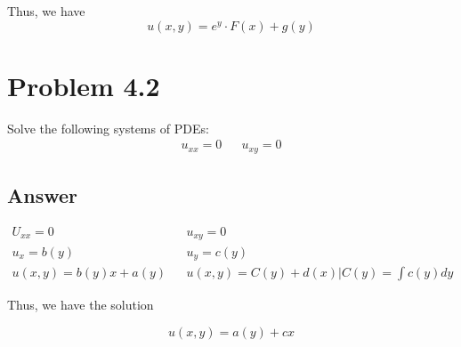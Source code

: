 \documentclass{article}
\begin{document}
Thus, we have
$$u(x,y) = e^{y} \cdot F(x) + g(y)$$


\section*{Problem 4.2}

Solve the following systems of PDEs:
\begin{align*} u_{xx} = 0 && u_{xy} =0 \end{align*}

\subsection*{Answer}

\begin{align*}
U_{xx} = 0 && u_{xy}=0\\
u_x = b(y) && u_{y} = c(y)\\
u(x,y) = b(y)x + a(y) && u(x,y) = C(y) + d(x)\Bigr|C(y) = \int c(y) dy
\end{align*}

Thus, we have the solution

$$u(x,y) = a(y) + cx$$
\end{document}

